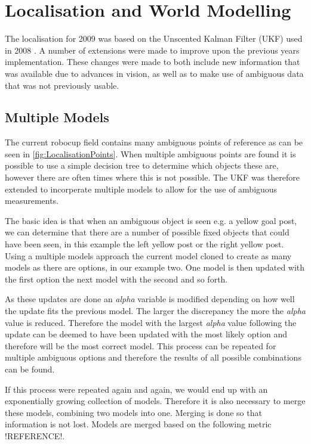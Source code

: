 \section{Localisation and World Modelling}
\label{sec:Localisation}
The localisation for 2009 was based on the Unscented Kalman Filter (UKF) used in 2008 \cite{NUManoids2008}. A number of extensions were made to improve upon the previous years implementation. These changes were made to both include new information that was available due to advances in vision, as well as to make use of ambiguous data that was not previously usable.

\subsection{Multiple Models}
The current robocup field contains many ambiguous points of reference as can be seen in \autoref{fig:LocalisationPoints}. When multiple ambiguous points are found it is possible to use a simple decision tree to determine which objects these are, however there are often times where this is not possible. The UKF was therefore extended to incorperate multiple models to allow for the use of ambiguous measurements.

The basic idea is that when an ambiguous object is seen e.g. a yellow goal post, we can determine that there are a number of possible fixed objects that could have been seen, in this example the left yellow post or the right yellow post. Using a multiple models approach the current model cloned to create as many models as there are options, in our example two. One model is then updated with the first option the next model with the second and so forth.

As these updates are done an \emph{alpha} variable is modified depending on how well the update fits the previous model. The larger the discrepancy the more the \emph{alpha} value is reduced. Therefore the model with the largest \emph{alpha} value following the update can be deemed to have been updated with the most likely option and therefore will be the most correct model. This process can be repeated for multiple ambiguous options and therefore the results of all possible combinations can be found.

If this process were repeated again and again, we would end up with an exponentially growing collection of models. Therefore it is also necessary to merge these models, combining two models into one. Merging is done so that information is not lost. Models are merged based on the following metric !REFERENCE!.


